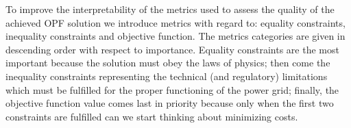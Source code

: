 To improve the interpretability of the metrics used to assess the quality of the achieved OPF solution
we introduce metrics with regard to: equality constraints, inequality constraints and objective function.
The metrics categories are given in descending order with respect to importance.
Equality constraints are the most important because the solution must obey the laws of physics;
then come the inequality constraints representing the technical (and regulatory) limitations
which must be fulfilled for the proper functioning of the power grid;
finally, the objective function value comes last in priority because only when the
first two constraints are fulfilled can we start thinking about minimizing costs.
